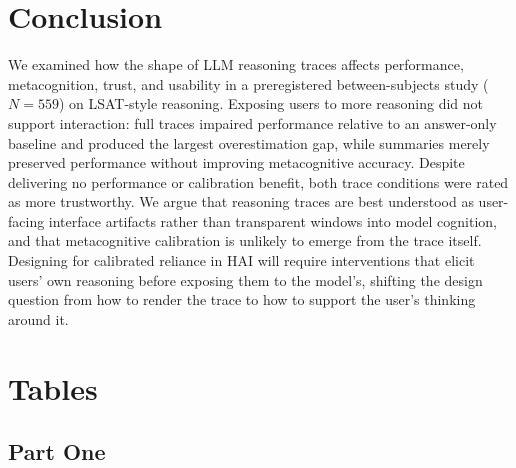 \documentclass[acmlarge,review=true, anonymous=true]{acmart}
\begin{document}


\section{Conclusion}

We examined how the shape of LLM reasoning traces affects performance, metacognition, trust, and usability in a preregistered between-subjects study ($N=559$) on LSAT-style reasoning. Exposing users to more reasoning did not support interaction: full traces impaired performance relative to an answer-only baseline and produced the largest overestimation gap, while summaries merely preserved performance without improving metacognitive accuracy. Despite delivering no performance or calibration benefit, both trace conditions were rated as more trustworthy. We argue that reasoning traces are best understood as user-facing interface artifacts rather than transparent windows into model cognition, and that metacognitive calibration is unlikely to emerge from the trace itself. Designing for calibrated reliance in HAI will require interventions that elicit users' own reasoning before exposing them to the model's, shifting the design question from how to render the trace to how to support the user's thinking around it.

\begin{acks}



\end{acks}






\appendix

\section{Tables}

\subsection{Part One}
\end{document}
